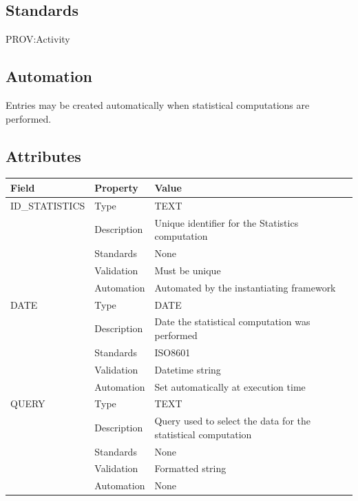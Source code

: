 \subsection{Standards}\label{standards-33}

PROV:Activity

\subsection{Automation}\label{automation-33}

Entries may be created automatically when statistical computations are
performed.

\subsection{Attributes}\label{attributes-28}

\begin{longtable}[]{@{}
  >{\raggedright\arraybackslash}p{}
  >{\raggedright\arraybackslash}p{}
  >{\raggedright\arraybackslash}p{}@{}}
\toprule\noalign{}
\begin{minipage}[b]{\linewidth}\raggedright
Field
\end{minipage} & \begin{minipage}[b]{\linewidth}\raggedright
Property
\end{minipage} & \begin{minipage}[b]{\linewidth}\raggedright
Value
\end{minipage} \\
\midrule\noalign{}
\endhead
\bottomrule\noalign{}
\endlastfoot
ID\_STATISTICS & Type & TEXT \\
& Description & Unique identifier for the Statistics computation \\
& Standards & None \\
& Validation & Must be unique \\
& Automation & Automated by the instantiating framework \\
DATE & Type & DATE \\
& Description & Date the statistical computation was performed \\
& Standards & ISO8601 \\
& Validation & Datetime string \\
& Automation & Set automatically at execution time \\
QUERY & Type & TEXT \\
& Description & Query used to select the data for the statistical
computation \\
& Standards & None \\
& Validation & Formatted string \\
& Automation & None \\
\end{longtable}

